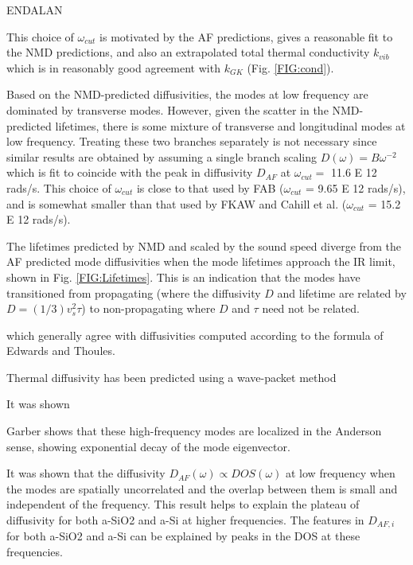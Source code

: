 \documentclass[aps,prb,onecolumn,preprint,superscriptaddress,footinbib,amsmath,amssymb,floatfix]{revtex4}
\begin{document}
ENDALAN

This 
choice of $\omega_{cut}$ is motivated by the AF predictions, gives a 
reasonable fit to the NMD predictions, and also an extrapolated total 
thermal conductivity $k_{vib}$ which is in reasonably good agreement 
with $k_{GK}$ (Fig. \ref{FIG:cond}). 

Based on the NMD-predicted diffusivities, the modes at low frequency are 
dominated by transverse modes. However, given the scatter in the 
NMD-predicted lifetimes, there is some mixture of 
transverse and longitudinal 
modes at low frequency.  Treating these two branches separately 
is not necessary since similar results are obtained by assuming a single 
branch scaling $D(\omega)=B\omega^{-2}$ which is fit to coincide with the 
peak in diffusivity $D_{AF}$ at $\omega_{cut} = $ 11.6 E 12 rads/s. This 
choice of $\omega_{cut}$ is close to that used by 
FAB ($\omega_{cut}$ = 9.65 E 12 rads/s),\cite{feldman_thermal_1993} 
and is somewhat smaller than 
that used by FKAW\cite{feldman_numerical_1999} 
and Cahill et al.\cite{cahill_thermal_1994} 
($\omega_{cut}$ = 15.2 E 12 rads/s). 

The lifetimes predicted by NMD and scaled by the sound speed 
diverge from the AF predicted mode diffusivities when the mode 
lifetimes approach the IR limit, shown in 
Fig. \ref{FIG:Lifetimes}. This is an indication that the modes 
have transitioned 
from propagating (where the diffusivity $D$ and lifetime are 
related by $D = (1/3)v^2_s\tau$) to non-propagating where 
$D$ and $\tau$ need not be related.
\cite{allen_thermal_1993,feldman_thermal_1993,feldman_numerical_1999,
allen_evolution_1998}

which generally agree with diffusivities computed according to the 
formula of Edwards and Thoules.\cite{edwards_numerical_1972,
feldman_numerical_1999,beltukov_ioffe-regel_2013}

Thermal diffusivity has been predicted using a wave-packet method

It was shown 

Garber shows that these high-frequency modes are localized in the 
Anderson sense, showing exponential decay of the mode eigenvector.
\cite{garber_numerical_2001}

It was shown that the diffusivity $D_{AF}(\omega) \propto DOS(\omega)$ 
at low frequency when the modes are spatially uncorrelated and the 
overlap between them is small and independent of the frequency.
\cite{vitelli_heat_2010,xu_energy_2009} This result helps to explain 
the plateau of diffusivity for both a-SiO2 and a-Si at higher 
frequencies. The features in $D_{AF,i}$ for both a-SiO2 and a-Si can 
be explained by peaks in the DOS at these frequencies. 
\end{document}
